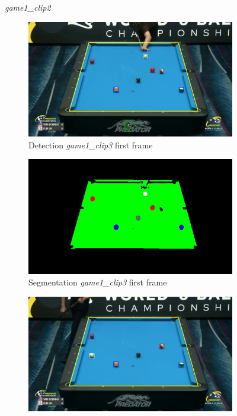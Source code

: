\begin{figure}[H]
	\caption{\textit{game1\_clip2}}
\end{figure}

\begin{figure}[H]
	\centering
	\begin{subfigure}[b]{0.48\textwidth}
		\centering
		\includegraphics[width=\textwidth]{images/Detection/game1_clip3_detected_balls_first_frame.jpg}
		\caption{Detection \textit{game1\_clip3} first frame}
		\label{fig: game1_clip3_first_frame_detected}
	\end{subfigure}
	\begin{subfigure}[b]{0.48\textwidth}
		\centering
		\includegraphics[width=\textwidth]{images/Segmentation/game1_clip3_segmented_balls_first_frame.jpg}
		\caption{Segmentation \textit{game1\_clip3} first frame}
		\label{fig: game1_clip3_first_frame_segmented}
	\end{subfigure}
	\begin{subfigure}[b]{0.48\textwidth}
		\centering
		\includegraphics[width=\textwidth]{images/Detection/game1_clip3_detected_balls_last_frame.jpg}

\end{subfigure}
\end{figure}
